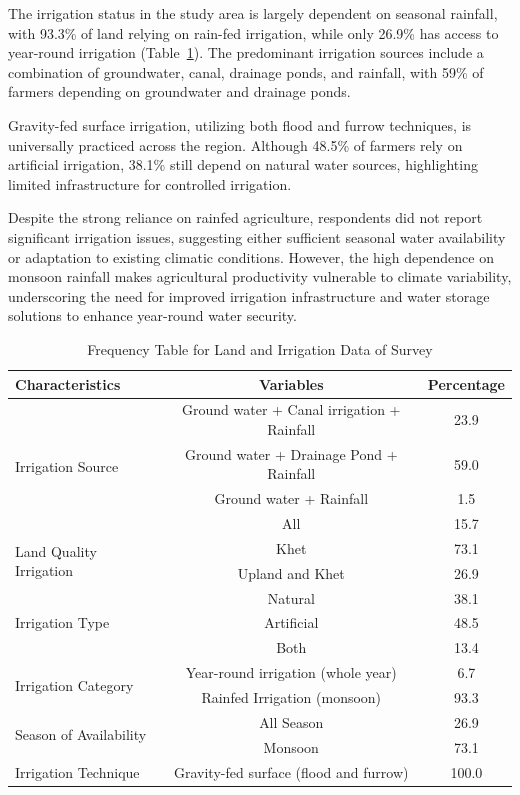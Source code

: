 The irrigation status in the study area is largely dependent on seasonal rainfall, with 93.3\% of land relying on rain-fed irrigation, while only 26.9\% has access to year-round irrigation (Table~\ref{tab:irrigation_data}). The predominant irrigation sources include a combination of groundwater, canal, drainage ponds, and rainfall, with 59\% of farmers depending on groundwater and drainage ponds. 

Gravity-fed surface irrigation, utilizing both flood and furrow techniques, is universally practiced across the region. Although 48.5\% of farmers rely on artificial irrigation, 38.1\% still depend on natural water sources, highlighting limited infrastructure for controlled irrigation. 

Despite the strong reliance on rainfed agriculture, respondents did not report significant irrigation issues, suggesting either sufficient seasonal water availability or adaptation to existing climatic conditions. However, the high dependence on monsoon rainfall makes agricultural productivity vulnerable to climate variability, underscoring the need for improved irrigation infrastructure and water storage solutions to enhance year-round water security.




\begin{table}[htbp]
    \centering
    \caption{Frequency Table for Land and Irrigation Data of Survey}
    \label{tab:irrigation_data}
    \begin{tabular}{@{}lcc@{}}
        \toprule
        \textbf{Characteristics} & \textbf{Variables} & \textbf{Percentage} \\
        \midrule
        \multirow{4}{*}{Irrigation Source} & Ground water + Canal irrigation + Rainfall & 23.9 \\
        & Ground water + Drainage Pond + Rainfall & 59.0 \\
        & Ground water + Rainfall & 1.5 \\
        & All & 15.7 \\
        \midrule
        \multirow{2}{*}{Land Quality Irrigation} & Khet & 73.1 \\
        & Upland and Khet & 26.9 \\
        \midrule
        \multirow{3}{*}{Irrigation Type} & Natural & 38.1 \\
        & Artificial & 48.5 \\
        & Both & 13.4 \\
        \midrule
        \multirow{2}{*}{Irrigation Category} & Year-round irrigation (whole year) & 6.7 \\
        & Rainfed Irrigation (monsoon) & 93.3 \\
        \midrule
        \multirow{2}{*}{Season of Availability} & All Season & 26.9 \\
        & Monsoon & 73.1 \\
        \midrule
        Irrigation Technique & Gravity-fed surface (flood and furrow) & 100.0 \\
        \bottomrule
    \end{tabular}
\end{table}

